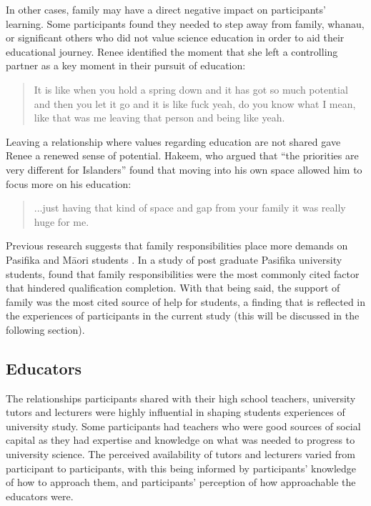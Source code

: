 In other cases, family may have a direct negative impact on participants' learning. Some participants found they needed to step away from family, whanau, or significant others who did not value science education in order to aid their educational journey. Renee identified the moment that she left a controlling partner as a key moment in their pursuit of education: \blockquote{It is like when you hold a spring down and it has got so much potential and then you let it go and it is like fuck yeah, do you know what I mean, like that was me leaving that person and being like yeah.}. Leaving a relationship where values regarding education are not shared gave Renee a renewed sense of potential. Hakeem, who argued that ``the priorities are very different for Islanders'' found that moving into his own space allowed him to focus more on his education: \blockquote{...just having that kind of space and gap from your family it was really huge for me.} Previous research suggests that family responsibilities place more demands on Pasifika and M\={a}ori students \citep{zepke2011non}. In a study of post graduate Pasifika university students, \cite{theodore2018pacific} found that family responsibilities were the most commonly cited factor that hindered qualification completion. With that being said, the support of family was the most cited source of help for students, a finding that is reflected in the experiences of participants in the current study (this will be discussed in the following section). 


\subsection{Educators}
The relationships participants shared with their high school teachers, university tutors and lecturers were highly influential in shaping students experiences of university study. Some participants had teachers who were good sources of social capital as they had expertise and knowledge on what was needed to progress to university science. The perceived availability of tutors and lecturers varied from participant to participants, with this being informed by participants' knowledge of how to approach them, and participants' perception of how approachable the educators were. 

